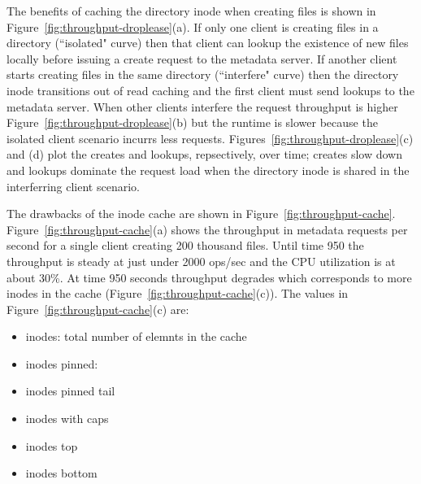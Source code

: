 The benefits of caching the directory inode when creating files is shown in
Figure~\ref{fig:throughput-droplease}(a).  If only one client is creating files
in a directory (``isolated" curve) then that client can lookup the existence of
new files locally before issuing a create request to the metadata server. If
another client starts creating files in the same directory (``interfere" curve)
then the directory inode transitions out of read caching and the first client
must send lookups to the metadata server. When other clients interfere the
request throughput is higher Figure~\ref{fig:throughput-droplease}(b) but the
runtime is slower because the isolated client scenario incurrs less requests.
Figures~\ref{fig:throughput-droplease}(c) and (d) plot the creates and lookups,
repsectively, over time; creates slow down and lookups dominate the request
load when the directory inode is shared in the interferring client scenario.


The drawbacks of the inode cache are shown in
Figure~\ref{fig:throughput-cache}.  Figure~\ref{fig:throughput-cache}(a) shows
the throughput in metadata requests per second for a single client creating 200
thousand files. Until time 950 the throughput is steady at just under 2000
ops/sec and the CPU utilization is at about 30\%. At time 950 seconds
throughput degrades which corresponds to more inodes in the cache
(Figure~\ref{fig:throughput-cache}(c)). The values in
Figure~\ref{fig:throughput-cache}(c) are:

\begin{itemize}
  \item inodes: total number of elemnts in the cache
  \item inodes pinned: 
  \item inodes pinned tail
  \item inodes with caps
  \item inodes top
  \item inodes bottom 
\end{itemize}

